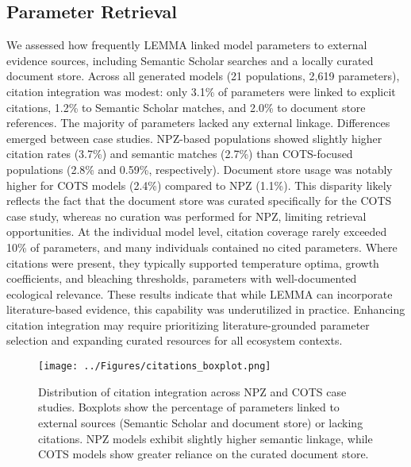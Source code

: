\subsection{Parameter Retrieval}
\label{sec:citations_analysis}
We assessed how frequently LEMMA linked model parameters to external evidence sources, including Semantic Scholar searches and a locally curated document store. Across all generated models (21 populations, 2,619 parameters), citation integration was modest: only 3.1\% of parameters were linked to explicit citations, 1.2\% to Semantic Scholar matches, and 2.0\% to document store references. The majority of parameters lacked any external linkage.
Differences emerged between case studies. NPZ-based populations showed slightly higher citation rates (3.7\%) and semantic matches (2.7\%) than COTS-focused populations (2.8\% and 0.59\%, respectively). Document store usage was notably higher for COTS models (2.4\%) compared to NPZ (1.1\%). This disparity likely reflects the fact that the document store was curated specifically for the COTS case study, whereas no curation was performed for NPZ, limiting retrieval opportunities.
At the individual model level, citation coverage rarely exceeded 10\% of parameters, and many individuals contained no cited parameters. Where citations were present, they typically supported temperature optima, growth coefficients, and bleaching thresholds, parameters with well-documented ecological relevance. These results indicate that while LEMMA can incorporate literature-based evidence, this capability was underutilized in practice. Enhancing citation integration may require prioritizing literature-grounded parameter selection and expanding curated resources for all ecosystem contexts.
\begin{figure}[H]
\centering
\texttt{[image: ../Figures/citations\_boxplot.png]}
\caption{Distribution of citation integration across NPZ and COTS case studies. Boxplots show the percentage of parameters linked to external sources (Semantic Scholar and document store) or lacking citations. NPZ models exhibit slightly higher semantic linkage, while COTS models show greater reliance on the curated document store.}
\label{fig:citations_boxplot}
\end{figure}